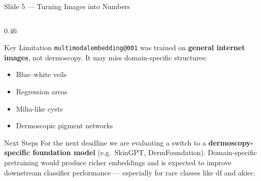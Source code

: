 \documentclass[aspectratio=169, 9pt]{beamer}
\begin{document}
\begin{frame}{Slide 5 --- Turning Images into Numbers}
\begin{columns}[T]
\begin{column}{0.46\textwidth}
      \begin{alertblock}{Key Limitation}
        \small
        \texttt{multimodalembedding@001} was trained on \textbf{general internet
        images}, not dermoscopy. It may miss domain-specific structures:
        \begin{itemize}[leftmargin=1em, itemsep=0pt]
          \item Blue--white veils
          \item Regression areas
          \item Milia-like cysts
          \item Dermoscopic pigment networks
        \end{itemize}
      \end{alertblock}

      \vspace{0.6em}
      \begin{block}{Next Steps}
        \small
        For the next deadline we are evaluating a switch to a
        \textbf{dermoscopy-specific foundation model}
        (e.g.\ SkinGPT, DermFoundation).
        Domain-specific pretraining would produce richer embeddings
        and is expected to improve downstream classifier performance
        --- especially for rare classes like df and akiec.
      \end{block}

    \end{column}

  \end{columns}
\end{frame}
\end{document}

